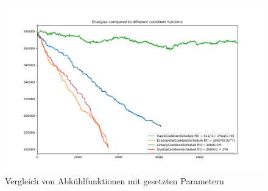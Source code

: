 \begin{figure}[H]\label{pic:Cool Down Comparisson}
    \centering
    \includegraphics[width=\linewidth]{content/simulatedAnnealing/Bilder/Energy_Cooldown_compared_steps_9842.png}
    \caption{Vergleich von Abkühlfunktionen mit gesetzten Parametern}
\end{figure}

